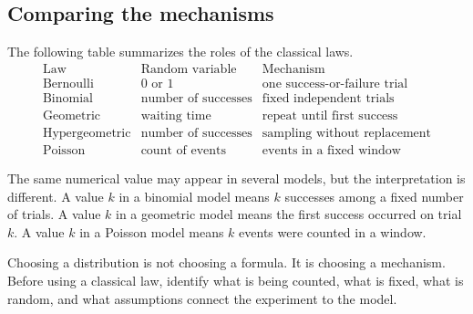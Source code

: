 \subsection*{Comparing the mechanisms}

The following table summarizes the roles of the classical laws.
\[
\begin{array}{c|c|c}
\text{Law} & \text{Random variable} & \text{Mechanism}\\
\hline
\text{Bernoulli} & 0\text{ or }1 & \text{one success-or-failure trial}\\
\text{Binomial} & \text{number of successes} & \text{fixed independent trials}\\
\text{Geometric} & \text{waiting time} & \text{repeat until first success}\\
\text{Hypergeometric} & \text{number of successes} & \text{sampling without replacement}\\
\text{Poisson} & \text{count of events} & \text{events in a fixed window}
\end{array}
\]

The same numerical value may appear in several models, but the interpretation is
different. A value \(k\) in a binomial model means \(k\) successes among a fixed
number of trials. A value \(k\) in a geometric model means the first success
occurred on trial \(k\). A value \(k\) in a Poisson model means \(k\) events were
counted in a window.

\begin{remarkbox}
Choosing a distribution is not choosing a formula. It is choosing a mechanism.
Before using a classical law, identify what is being counted, what is fixed, what
is random, and what assumptions connect the experiment to the model.
\end{remarkbox}
